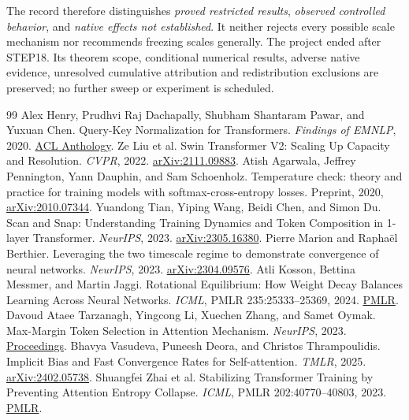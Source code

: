 \documentclass[10pt,a4paper]{article}
\begin{document}
The record therefore distinguishes \emph{proved restricted results}, \emph{observed controlled behavior}, and \emph{native effects not established}. It neither rejects every possible scale mechanism nor recommends freezing scales generally. The project ended after STEP18. Its theorem scope, conditional numerical results, adverse native evidence, unresolved cumulative attribution and redistribution exclusions are preserved; no further sweep or experiment is scheduled.
\begin{thebibliography}{99}
\setlength{\itemsep}{3pt}
 Alex Henry, Prudhvi Raj Dachapally, Shubham Shantaram Pawar, and Yuxuan Chen. Query-Key Normalization for Transformers. \emph{Findings of EMNLP}, 2020. \href{https://aclanthology.org/2020.findings-emnlp.379/}{ACL Anthology}.
 Ze Liu et al. Swin Transformer V2: Scaling Up Capacity and Resolution. \emph{CVPR}, 2022. \href{https://arxiv.org/abs/2111.09883}{arXiv:2111.09883}.
 Atish Agarwala, Jeffrey Pennington, Yann Dauphin, and Sam Schoenholz. Temperature check: theory and practice for training models with softmax-cross-entropy losses. Preprint, 2020, \href{https://arxiv.org/abs/2010.07344}{arXiv:2010.07344}.
 Yuandong Tian, Yiping Wang, Beidi Chen, and Simon Du. Scan and Snap: Understanding Training Dynamics and Token Composition in 1-layer Transformer. \emph{NeurIPS}, 2023. \href{https://arxiv.org/abs/2305.16380}{arXiv:2305.16380}.
 Pierre Marion and Rapha\"el Berthier. Leveraging the two timescale regime to demonstrate convergence of neural networks. \emph{NeurIPS}, 2023. \href{https://arxiv.org/abs/2304.09576}{arXiv:2304.09576}.
 Atli Kosson, Bettina Messmer, and Martin Jaggi. Rotational Equilibrium: How Weight Decay Balances Learning Across Neural Networks. \emph{ICML}, PMLR 235:25333--25369, 2024. \href{https://proceedings.mlr.press/v235/kosson24a.html}{PMLR}.
 Davoud Ataee Tarzanagh, Yingcong Li, Xuechen Zhang, and Samet Oymak. Max-Margin Token Selection in Attention Mechanism. \emph{NeurIPS}, 2023. \href{https://proceedings.neurips.cc/paper_files/paper/2023/hash/970f59b22f4c72aec75174aae63c7459-Abstract-Conference.html}{Proceedings}.
 Bhavya Vasudeva, Puneesh Deora, and Christos Thrampoulidis. Implicit Bias and Fast Convergence Rates for Self-attention. \emph{TMLR}, 2025. \href{https://arxiv.org/abs/2402.05738}{arXiv:2402.05738}.
 Shuangfei Zhai et al. Stabilizing Transformer Training by Preventing Attention Entropy Collapse. \emph{ICML}, PMLR 202:40770--40803, 2023. \href{https://proceedings.mlr.press/v202/zhai23a.html}{PMLR}.

\end{thebibliography}
\end{document}
